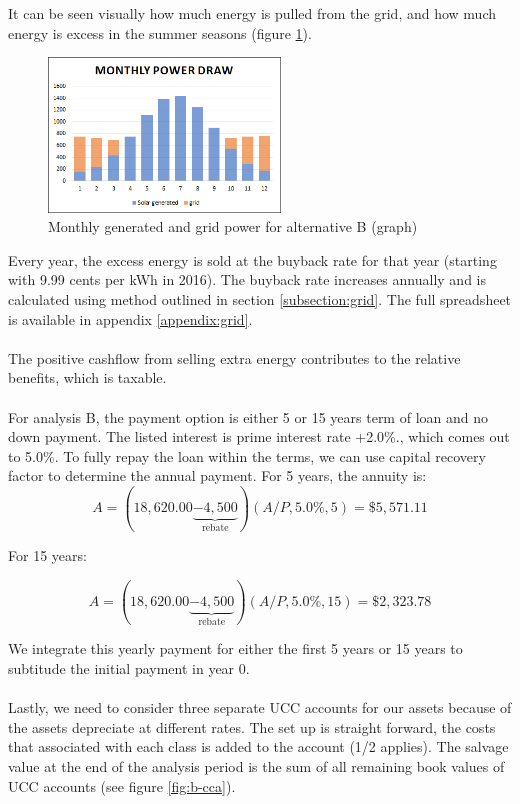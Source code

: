 \documentclass[10pt,letterpaper]{article}
\begin{document}
It can be seen visually how much energy is pulled from the grid, and how much energy is excess in the summer seasons (figure \ref{fig:b-generation}).\\

\begin{figure}[H]
	\centering
	\includegraphics[width=0.55\textwidth]{assets/1534568203596}
	\caption{Monthly generated and grid power for alternative B (graph)}
	\label{fig:b-generation}
\end{figure}

Every year, the excess energy is sold at the buyback rate for that year (starting with 9.99 cents per kWh in 2016). The buyback rate increases annually and is calculated using method outlined in section \ref{subsection:grid}. The full spreadsheet is available in appendix \ref{appendix:grid}.\\
\\
The positive cashflow from selling extra energy contributes to the relative benefits, which is taxable.\\
\\
For analysis B, the payment option is either 5 or 15 years term of loan and no down payment. The listed interest is prime interest rate +2.0\%.\cite{kuby-costs}, which comes out to 5.0\%. To fully repay the loan within the terms, we can use capital recovery factor to determine the annual payment. For 5 years, the annuity is:\\

$$
A=\left(18,620.00\underbrace{-4,500}_\text{rebate}\right)(A/P, 5.0\%, 5)=\$5,571.11
$$

For 15 years:

$$
A=\left(18,620.00\underbrace{-4,500}_\text{rebate}\right)(A/P, 5.0\%, 15)=\$2,323.78 
$$

We integrate this yearly payment for either the first 5 years or 15 years to subtitude the initial payment in year 0.\\
\\
Lastly, we need to consider three separate UCC accounts for our assets because of the assets depreciate at different rates. The set up is straight forward, the costs that associated with each class is added to the account (1/2 applies). The salvage value at the end of the analysis period is the sum of all remaining book values of UCC accounts (see figure \ref{fig:b-cca}).\\
\end{document}
